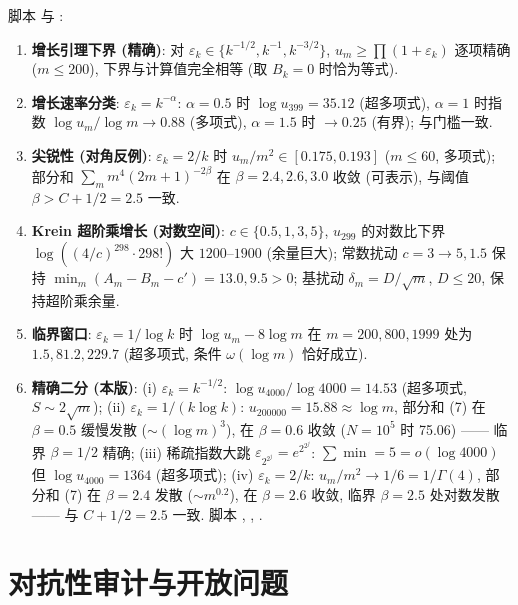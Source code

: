 \documentclass[UTF8]{ctexart}
\begin{document}
脚本  与 :
\begin{enumerate}
	\item \textbf{增长引理下界 (精确)}: 对 $\varepsilon_k \in
		\{k^{-1/2}, k^{-1}, k^{-3/2}\}$, $u_m \geq \prod(1+\varepsilon_k)$
		逐项精确 ($m \leq 200$), 下界与计算值完全相等 (取 $B_k = 0$ 时恰为等式).
	\item \textbf{增长速率分类}: $\varepsilon_k = k^{-\alpha}$:
		$\alpha = 0.5$ 时 $\log u_{399} = 35.12$ (超多项式),
		$\alpha = 1$ 时指数 $\log u_m/\log m \to 0.88$ (多项式),
		$\alpha = 1.5$ 时 $\to 0.25$ (有界); 与门槛一致.
	\item \textbf{尖锐性 (对角反例)}: $\varepsilon_k = 2/k$ 时
		$u_m/m^2 \in [0.175, 0.193]$ ($m \leq 60$, 多项式);
		部分和 $\sum_m m^4(2m+1)^{-2\beta}$ 在 $\beta = 2.4, 2.6, 3.0$
		收敛 (可表示), 与阈值 $\beta > C + 1/2 = 2.5$ 一致.
	\item \textbf{Krein 超阶乘增长 (对数空间)}: $c \in \{0.5, 1, 3, 5\}$,
		$u_{299}$ 的对数比下界 $\log((4/c)^{298} \cdot 298!)$ 大 $1200$--$1900$
		(余量巨大); 常数扰动 $c = 3 \to 5, 1.5$ 保持
		$\min_m(A_m - B_m - c') = 13.0, 9.5 > 0$; 基扰动
		$\delta_m = D/\sqrt m$, $D \leq 20$, 保持超阶乘余量.
	\item \textbf{临界窗口}: $\varepsilon_k = 1/\log k$ 时
		$\log u_m - 8\log m$ 在 $m = 200, 800, 1999$ 处为
		$1.5, 81.2, 229.7$ (超多项式, 条件 $\omega(\log m)$ 恰好成立).
	\item \textbf{精确二分 (本版)}: (i) $\varepsilon_k = k^{-1/2}$:
		$\log u_{4000}/\log 4000 = 14.53$ (超多项式, $S \sim 2\sqrt m$);
		(ii) $\varepsilon_k = 1/(k\log k)$: $u_{200000} = 15.88 \approx \log m$,
		部分和 (7) 在 $\beta = 0.5$ 缓慢发散 ($\sim (\log m)^3$),
		在 $\beta = 0.6$ 收敛 ($N=10^5$ 时 75.06) —— 临界 $\beta = 1/2$
		精确; (iii) 稀疏指数大跳 $\varepsilon_{2^{2^j}} = e^{2^{2^j}}$:
		$\sum\min = 5 = o(\log 4000)$ 但 $\log u_{4000} = 1364$ (超多项式);
		(iv) $\varepsilon_k = 2/k$: $u_m/m^2 \to 1/6 = 1/\Gamma(4)$, 部分和 (7)
		在 $\beta = 2.4$ 发散 ($\sim m^{0.2}$), 在 $\beta = 2.6$ 收敛,
		临界 $\beta = 2.5$ 处对数发散 —— 与 $C+1/2 = 2.5$ 一致.
		脚本 ,
		, .
\end{enumerate}

\section{对抗性审计与开放问题}
\end{document}
